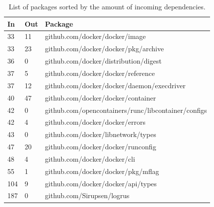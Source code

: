 \begin{table}[H]
\caption{List of packages sorted by the amount of incoming dependencies.}
\label{table:deptablehighestin}

\begin{tabular}{l l l}
\textbf{In} & \textbf{Out} & \textbf{Package} \\
\midrule
33 & 11 & github.com/docker/docker/image \\
33 & 23 & github.com/docker/docker/pkg/archive \\
36 & 0 & github.com/docker/distribution/digest \\
37 & 5 & github.com/docker/docker/reference \\
37 & 12 & github.com/docker/docker/daemon/execdriver \\
40 & 47 & github.com/docker/docker/container \\
42 & 0 & github.com/opencontainers/runc/libcontainer/configs \\
42 & 4 & github.com/docker/docker/errors \\
43 & 0 & github.com/docker/libnetwork/types \\
47 & 20 & github.com/docker/docker/runconfig \\
48 & 4 & github.com/docker/docker/cli \\
55 & 1 & github.com/docker/docker/pkg/mflag \\
104 & 9 & github.com/docker/docker/api/types \\
187 & 0 & github.com/Sirupsen/logrus \\
\end{tabular} 
\end{table}

